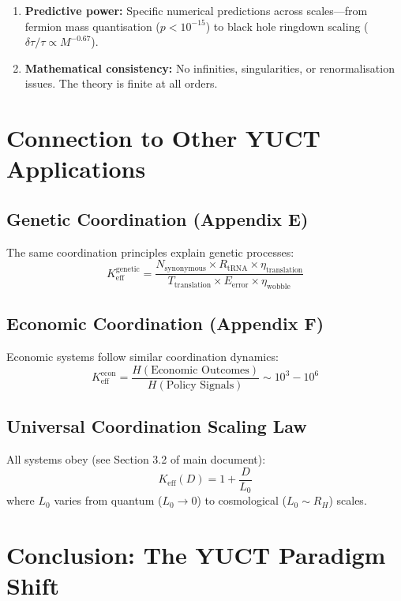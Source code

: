 \documentclass[12pt,a4paper]{article}
\theoremstyle{remark}
\newcommand{\Keff}{K_{\mathrm{eff}}}
\begin{document}
\begin{enumerate}
	\item \textbf{Predictive power:} Specific numerical predictions across
	scales---from fermion mass quantisation ($p<10^{-15}$) to black hole
	ringdown scaling ($\delta\tau/\tau\propto M^{-0.67}$).
	
	\item \textbf{Mathematical consistency:} No infinities, singularities, or
	renormalisation issues. The theory is finite at all orders.
\end{enumerate}
	
	\section{Connection to Other YUCT Applications}
	\label{sec:connections}
	
	\subsection{Genetic Coordination (Appendix E)}
	
	The same coordination principles explain genetic processes:
	\[
	K_{\text{eff}}^{\text{genetic}} = \frac{N_{\text{synonymous}} \times R_{\text{tRNA}} \times \eta_{\text{translation}}}{T_{\text{translation}} \times E_{\text{error}} \times \eta_{\text{wobble}}}
	\]
	
	\subsection{Economic Coordination (Appendix F)}
	
	Economic systems follow similar coordination dynamics:
	\[
	K_{\text{eff}}^{\text{econ}} = \frac{H(\text{Economic Outcomes})}{H(\text{Policy Signals})} \sim 10^3-10^6
	\]
	
	\subsection{Universal Coordination Scaling Law}
	
	All systems obey (see Section 3.2 of main document):
	\[
	\boxed{\Keff(D) = 1 + \frac{D}{L_0}}
	\]
	where $L_0$ varies from quantum ($L_0 \to 0$) to cosmological ($L_0 \sim R_H$) scales.
	
	\section{Conclusion: The YUCT Paradigm Shift}
	\label{sec:conclusion}
	
\end{document}
